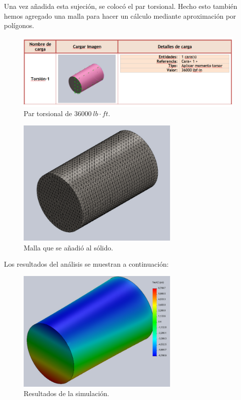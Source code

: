 \documentclass[12pt, letterpaper]{article}
\begin{document}
Una vez añadida esta sujeción, se colocó el par torsional. Hecho esto también hemos agregado una malla para hacer un cálculo mediante aproximación por polígonos.

\begin{figure}[H]
	\centering
	\includegraphics[width=\textwidth]{par.png}
	\caption{Par torsional de $36000\ lb \cdot ft$.}
\end{figure}

\begin{figure}[H]
	\centering
	\includegraphics[width=0.7\textwidth]{malla.png}
	\caption{Malla que se añadió al sólido.}
\end{figure}

Los resultados del análisis se muestran a continuación:

\begin{figure}[H]
	\centering
	\includegraphics[width=0.7\textwidth]{data.png}
	\caption{Resultados de la simulación.}
\end{figure}
\end{document}
